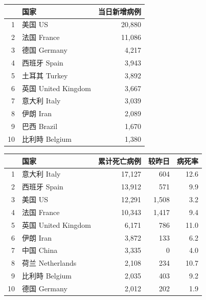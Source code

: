 \documentclass[]{article}
\begin{document}
\begin{table}[H]
  \vspace{-7mm}
    \caption{日新增病例前十位国家}
      \vspace{-0.5\baselineskip}
      \centering \begin{table}[H]
\centering
\begin{tabular}{rlr}
\toprule
  & 国家 & 当日新增病例\\
\midrule
\rowcolor{gray!6}  1 & 美国 US & 20,880\\
2 & 法国 France & 11,086\\
\rowcolor{gray!6}  3 & 德国 Germany & 4,217\\
4 & 西班牙 Spain & 3,943\\
\rowcolor{gray!6}  5 & 土耳其 Turkey & 3,892\\
6 & 英国 United Kingdom & 3,667\\
\rowcolor{gray!6}  7 & 意大利 Italy & 3,039\\
8 & 伊朗 Iran & 2,089\\
\rowcolor{gray!6}  9 & 巴西 Brazil & 1,670\\
10 & 比利時 Belgium & 1,380\\
\bottomrule
\end{tabular}
\end{table} \end{table}\begin{table}[H]
  \vspace{-7mm}
    \caption{累计死亡病例前十位国家}
      \vspace{-0.5\baselineskip}
      \centering \begin{table}[H]
\centering
\begin{tabular}{rlrrr}
\toprule
  & 国家 & 累计死亡病例 & 较昨日 & 病死率\\
\midrule
\rowcolor{gray!6}  1 & 意大利 Italy & 17,127 & 604 & 12.6\\
2 & 西班牙 Spain & 13,912 & 571 & 9.9\\
\rowcolor{gray!6}  3 & 美国 US & 12,291 & 1,508 & 3.2\\
4 & 法国 France & 10,343 & 1,417 & 9.4\\
\rowcolor{gray!6}  5 & 英国 United Kingdom & 6,171 & 786 & 11.0\\
6 & 伊朗 Iran & 3,872 & 133 & 6.2\\
\rowcolor{gray!6}  7 & 中国 China & 3,335 & 0 & 4.0\\
8 & 荷兰 Netherlands & 2,108 & 234 & 10.7\\
\rowcolor{gray!6}  9 & 比利時 Belgium & 2,035 & 403 & 9.2\\
10 & 德国 Germany & 2,012 & 202 & 1.9\\
\bottomrule
\end{tabular}
\end{table} \end{table}
\end{document}
